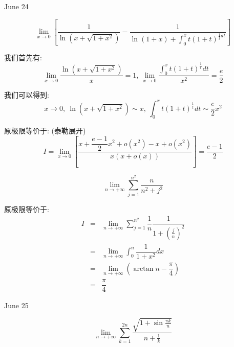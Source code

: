 \textcolor{purplea}{June 24}

\begin{example}[][Exam: 32.4.5]
	$$\lim\limits_{x\to 0}\left[ \dfrac{1}{\ln(x+\sqrt{1+x^2})}-\dfrac{1}{\ln(1+x)+\int_{0}^{x}t(1+t)^{\frac{1}{t}dt}}\right]$$
\end{example}

\begin{solution}
	
	我们首先有: 
	$$\lim\limits_{x\to 0}\dfrac{\ln(x+\sqrt{1+x^2})}{x}=1,\ \lim\limits_{x\to 0}\dfrac{\int_{0}^{x}t(1+t)^{\frac{1}{t}}dt}{x^2}=\frac{e}{2}$$
	
	我们可以得到: 
	$$x\to 0,\ \ln(x+\sqrt{1+x^2})\sim x,\ \int_{0}^{x}t(1+t)^{\frac{1}{t}}dt\sim \dfrac{e}{2}x^2$$
	
	原极限等价于: (泰勒展开)
	$$I=\lim\limits_{x\to 0}\left[ \dfrac{x+\dfrac{e-1}{2}x^2+o(x^2)-x+o(x^2)}{x(x+o(x))}\right]=\dfrac{e-1}{2}$$
\end{solution}

\begin{example}[][Exam: 32.4.6]
	$$\lim\limits_{n\to+\infty}\sum\limits_{j=1}^{n^2}\dfrac{n}{n^2+j^2}$$
\end{example}

\begin{solution}
	
	原极限等价于: 
	\begin{eqnarray*}
		I&=&\lim\limits_{n\to+\infty}\sum\limits_{j=1}^{n^2}\dfrac{1}{n}\dfrac{1}{1+(\frac{j}{n})^2}\\
		&=&\lim\limits_{n\to+\infty}\int_{0}^{n}\dfrac{1}{1+x^2}dx\\
		&=&\lim\limits_{n\to+\infty}(\arctan n-\dfrac{\pi}{4})\\
		&=&\dfrac{\pi}{4}
	\end{eqnarray*}
\end{solution}


\textcolor{purplea}{June 25}

\begin{example}[][Exam: 32.4.7]
	$$\lim\limits_{n\to+\infty}\sum\limits_{k=1}^{2n}\dfrac{\sqrt{1+\sin \frac{\pi k}{n}}}{n+\frac{1}{k}}$$
\end{example}

